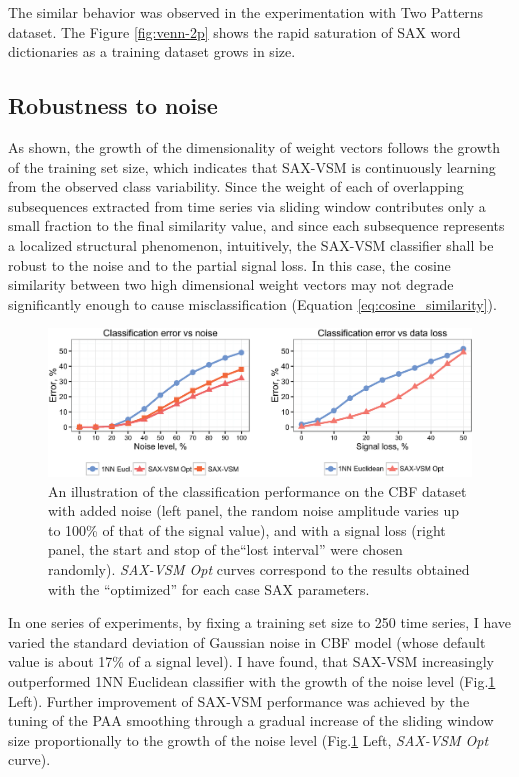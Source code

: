 The similar behavior was observed in the experimentation with Two Patterns dataset. 
The Figure \ref{fig:venn-2p} shows the rapid saturation of SAX word dictionaries as a training dataset grows in size.


\subsection{Robustness to noise}\label{saxvsm_robustness}
As shown, the growth of the dimensionality of \tfidf weight vectors follows the growth of the training set size, which indicates that SAX-VSM is continuously learning from the observed class variability. Since the weight of each of overlapping subsequences extracted from time series via sliding window contributes only a small fraction to the final similarity value, and since each subsequence represents a localized structural phenomenon, intuitively, the SAX-VSM classifier shall be robust to the noise and to the partial signal loss. In this case, the cosine similarity between two high dimensional weight vectors may not degrade significantly enough to cause misclassification (Equation \ref{eq:cosine_similarity}).

\begin{figure}[t]
  \centering
  \includegraphics[width=130mm]{figures/corrupted.eps}
  \caption{An illustration of the classification performance on the CBF dataset with added noise (left panel,
  the random noise amplitude varies up to 100\% of that of the signal value),
  and with a signal loss (right panel, the start and stop of the``lost interval'' were chosen randomly).
  \textit{SAX-VSM Opt} curves correspond to the results obtained with the ``optimized'' for each case 
  SAX parameters.}
  \label{fig:corrupted}
\end{figure}

In one series of experiments, by fixing a training set size to 250 time series, I have varied the standard deviation 
of Gaussian noise in CBF model (whose default value is about 17\% of a signal level). 
I have found, that SAX-VSM increasingly outperformed 1NN Euclidean classifier with the growth of the noise level 
(Fig.\ref{fig:corrupted} Left). 
Further improvement of SAX-VSM performance was achieved by the tuning of the PAA smoothing through a gradual 
increase of the sliding window size proportionally to the growth of the noise level 
(Fig.\ref{fig:corrupted} Left, \textit{SAX-VSM Opt} curve). 

